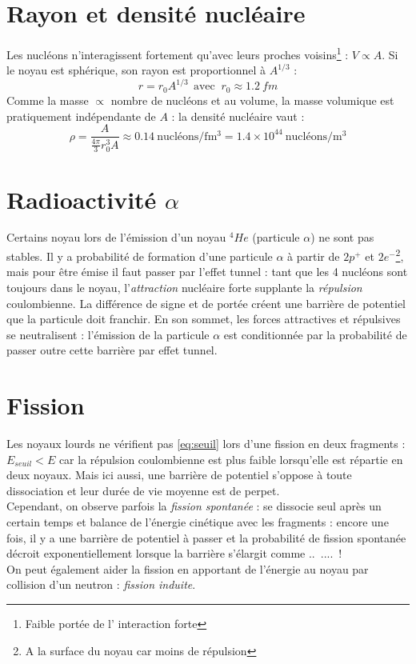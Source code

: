 \documentclass	[11pt, a4paper, openany]{book}
\begin{document}
\section{Rayon et densité nucléaire}
Les nucléons n'interagissent fortement qu'avec leurs proches voisins\footnote{Faible portée de l'
interaction forte} : $V \propto A$. Si le noyau est sphérique, son rayon est proportionnel à $A^{
1/3}$ :
\begin{equation}
r = r_0A^{1/3}\ \ \text{avec }\ r_0 \approx 1.2\ fm
\end{equation}
Comme la masse $\propto$ nombre de nucléons et au volume, la masse volumique est pratiquement indépendante
 de $A$ : la densité nucléaire vaut : 
\begin{equation}
\rho = \frac{A}{\frac{4\pi}{3}r_0^3A}\approx 0.14\ \text{nucléons/fm$^3$} = 1.4\times
10^{44}\ \text{nucléons/m$^3$}
\end{equation}

\section{Radioactivité $\alpha$}
Certains noyau lors de l'émission d'un noyau $^4He$ (particule $\alpha$) ne sont pas stables. Il 
y a probabilité de formation d'une particule $\alpha$ à partir  de $2 p^+$ et $2 e^-$\footnote{A la 
surface du noyau car moins de répulsion}, mais pour être émise il faut passer par l'effet tunnel : 
tant que les 4 nucléons sont toujours dans le noyau, l'\textit{attraction} nucléaire forte supplante 
la \textit{répulsion} coulombienne. La différence de signe et de portée créent une barrière de 
potentiel que la particule doit franchir. En son sommet, les forces attractives et répulsives se 
neutralisent : l'émission de la particule $\alpha$ est conditionnée par la probabilité de passer outre
cette barrière par effet tunnel.

\section{Fission}
Les noyaux lourds ne vérifient pas \autoref{eq:seuil} lors d'une fission en deux fragments : $E_{
seuil} < E$ car la répulsion coulombienne est plus faible lorsqu'elle est répartie en deux noyaux.
Mais ici aussi, une barrière de potentiel s'oppose à toute dissociation et leur durée de vie moyenne
est de perpet.\\

Cependant, on observe parfois la \textit{fission spontanée} : se dissocie seul après un certain temps
et balance de l'énergie cinétique avec les fragments : encore une fois, il y a une barrière de 
potentiel à passer et la probabilité de fission spontanée décroit exponentiellement lorsque la 
barrière s'élargit comme ..\ ....\ !\\
On peut également aider la fission en apportant de l'énergie au noyau par collision d'un neutron : 
\textit{fission induite}.
\end{document}
